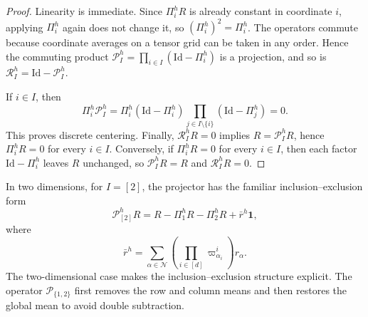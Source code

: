 \documentclass[11pt,letterpaper]{article}
\theoremstyle{definition}
\theoremstyle{remark}
\newcommand{\Id}{\mathrm{Id}}
\begin{document}
\begin{proof}
Linearity is immediate. Since $\Pi_i^hR$ is already constant in coordinate
$i$, applying $\Pi_i^h$ again does not change it, so $(\Pi_i^h)^2=\Pi_i^h$.
The operators commute because coordinate averages on a tensor grid can be
taken in any order. Hence the commuting product
$\mathcal P_I^h=\prod_{i\in I}(\Id-\Pi_i^h)$ is a projection, and so is
$\mathcal R_I^h=\Id-\mathcal P_I^h$.

If $i\in I$, then
$$
\Pi_i^h\mathcal P_I^h
=
\Pi_i^h(\Id-\Pi_i^h)
\prod_{j\in I\setminus\{i\}}(\Id-\Pi_j^h)
=0.
$$
This proves discrete centering. Finally,
$\mathcal R_I^hR=0$ implies $R=\mathcal P_I^hR$, hence
$\Pi_i^hR=0$ for every $i\in I$. Conversely, if $\Pi_i^hR=0$ for every
$i\in I$, then each factor $\Id-\Pi_i^h$ leaves $R$ unchanged, so
$\mathcal P_I^hR=R$ and $\mathcal R_I^hR=0$.
\end{proof}

In two dimensions, for $I=[2]$, the projector has the familiar
inclusion--exclusion form
$$
\mathcal P_{[2]}^hR
=
R-\Pi_1^hR-\Pi_2^hR+\bar r^h\mathbf 1,
$$
where
$$
\bar r^h
=
\sum_{\alpha\in\mathcal N}
\left(
\prod_{i\in[d]}\varpi_{\alpha_i}^i
\right)r_\alpha.
$$
The two-dimensional case makes the inclusion--exclusion structure explicit.
The operator $\mathcal P_{\{1,2\}}$ first removes the row and column means and
then restores the global mean to avoid double subtraction.















\end{document}

